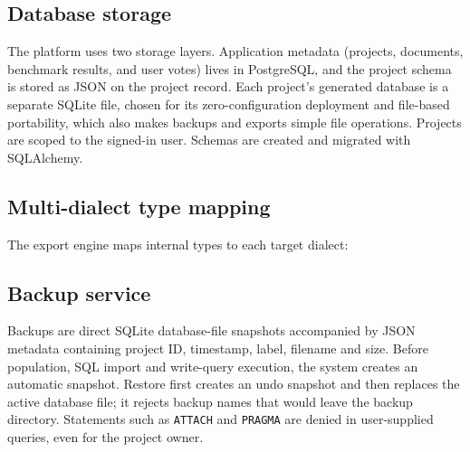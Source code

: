 \documentclass[11pt,a4paper]{article}
\begin{document}
\subsection{Database storage}
The platform uses two storage layers. Application metadata (projects, documents, benchmark results, and user votes) lives in PostgreSQL, and the project schema is stored as JSON on the project record. Each project's generated database is a separate SQLite file, chosen for its zero-configuration deployment and file-based portability, which also makes backups and exports simple file operations. Projects are scoped to the signed-in user. Schemas are created and migrated with SQLAlchemy.

\subsection{Multi-dialect type mapping}
The export engine maps internal types to each target dialect:

\begin{table}[htbp]
\centering
{}
\caption{Type mapping across the five supported SQL dialects.}
\label{tab:type-map}
\end{table}

\subsection{Backup service}
Backups are direct SQLite database-file snapshots accompanied by JSON metadata containing project ID, timestamp, label, filename and size. Before population, SQL import and write-query execution, the system creates an automatic snapshot. Restore first creates an undo snapshot and then replaces the active database file; it rejects backup names that would leave the backup directory. Statements such as \texttt{ATTACH} and \texttt{PRAGMA} are denied in user-supplied queries, even for the project owner.
\end{document}
